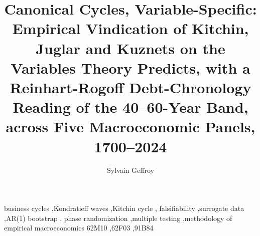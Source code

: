 \documentclass[review,12pt,authoryear]{elsarticle}
\begin{document}
\begin{frontmatter}

\title{Canonical Cycles, Variable-Specific: Empirical Vindication
of Kitchin, Juglar and Kuznets on the Variables Theory Predicts,
with a Reinhart-Rogoff Debt-Chronology Reading of the 40--60-Year
Band, across Five Macroeconomic Panels, 1700--2024}

\author{Sylvain Geffroy}



\begin{keyword}
business cycles \sep Kondratieff waves \sep Kitchin cycle \sep
falsifiability \sep surrogate data \sep AR(1) bootstrap \sep
phase randomization \sep multiple testing \sep methodology of
empirical macroeconomics
\MSC[2020] 62M10 \sep 62F03 \sep 91B84
\end{keyword}

\end{frontmatter}











\appendix




\end{document}
